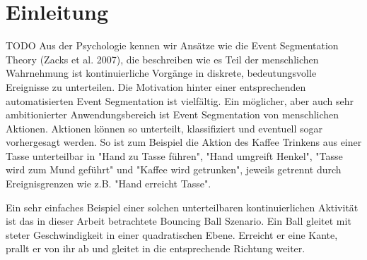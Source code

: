 \chapter{Einleitung}
\label{ch:introduction}
TODO
	Aus der Psychologie kennen wir Ansätze wie die Event Segmentation Theory (Zacks et al. 2007), die beschreiben wie es Teil der menschlichen Wahrnehmung ist kontinuierliche Vorgänge in diskrete, bedeutungsvolle Ereignisse zu unterteilen\cite{bib:est}.  
		Die Motivation hinter einer entsprechenden automatisierten Event Segmentation ist vielfältig. Ein möglicher, aber auch sehr ambitionierter Anwendungsbereich ist Event Segmentation von menschlichen Aktionen. Aktionen können so unterteilt, klassifiziert und eventuell sogar vorhergesagt werden. So ist zum Beispiel die Aktion des Kaffee Trinkens aus einer Tasse unterteilbar in "Hand zu Tasse führen", "Hand umgreift Henkel", "Tasse wird zum Mund geführt" und "Kaffee wird getrunken", jeweils getrennt durch Ereignisgrenzen wie z.B. "Hand erreicht Tasse". 
		
		Ein sehr einfaches Beispiel einer solchen unterteilbaren kontinuierlichen Aktivität ist das in dieser Arbeit betrachtete Bouncing Ball Szenario. Ein Ball gleitet mit steter Geschwindigkeit in einer quadratischen Ebene. Erreicht er eine Kante, prallt er von ihr ab und gleitet in die entsprechende Richtung weiter.
		
		
	
 